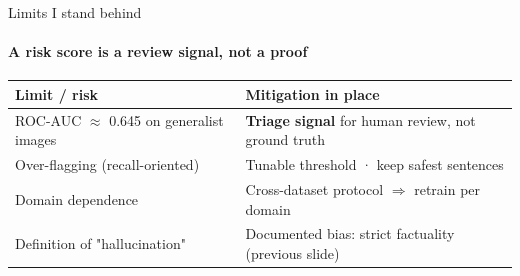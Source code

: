 \begin{frame}{Limits I stand behind}
  \framesubtitle{A risk score is a review signal, not a proof}
  \begin{enslide}
  \centering
  {\small
  \begin{tabular}{@{}p{} p{}@{}}
    \toprule
    \textbf{Limit / risk} & \textbf{Mitigation in place} \\
    \midrule
    ROC-AUC $\approx$ 0.645 on generalist images & \textbf{Triage signal} for human review, not ground truth \\
    Over-flagging (recall-oriented) & Tunable threshold · keep safest sentences \\
    Domain dependence & Cross-dataset protocol $\Rightarrow$ retrain per domain \\
    Definition of "hallucination" & Documented bias: strict factuality (previous slide) \\
    \bottomrule
  \end{tabular}}
  \vspace{0.3cm}

  \begin{center}
    \hspace{0.12cm}
    \hspace{0.12cm}
  \end{center}
  \end{enslide}
\end{frame}
